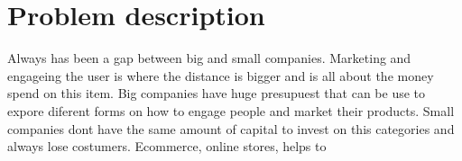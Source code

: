 \section{Problem description}

Always has been a gap between big and small companies. Marketing and engageing 
the user is where the distance is bigger and is all about the money spend on this item.
Big companies have huge presupuest that can be use to expore diferent forms on how to
engage people and market their products. Small companies dont have the same amount 
of capital to invest on this categories and always lose costumers.
Ecommerce, online stores, helps to 
